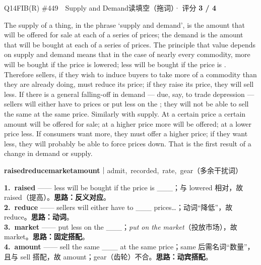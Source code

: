 \begin{qblock}{Q14\quad FIB(R) \#449\ \ Supply and Demand}{读填空（拖词）· 评分 \textcolor{cAccent}{\bfseries 3 / 4}}
\begin{promptbox}
The supply of a thing, in the phrase `supply and demand', is the amount that will be offered for sale at each of a series of prices; the demand is the amount that will be bought at each of a series of prices. The principle that value depends on supply and demand means that in the case of nearly every commodity, more will be bought if the price is lowered; less will be bought if the price is . Therefore sellers, if they wish to induce buyers to take more of a commodity than they are already doing, must reduce its price; if they raise its price, they will sell less. If there is a general falling-off in demand --- due, say, to trade depression --- sellers will either have to  prices or put less on the ; they will not be able to sell the same  at the same price. Similarly with supply. At a certain price a certain amount will be offered for sale; at a higher price more will be offered; at a lower price less. If consumers want more, they must offer a higher price; if they want less, they will probably be able to force prices down. That is the first result of a change in demand or supply.
\end{promptbox}
{\small \textbf{raised}\quad \textbf{reduce}\quad \textbf{market}\quad \textbf{amount}\quad ｜\quad admit,\ recorded,\ rate,\ gear（多余干扰词）}
\begin{notebox}\footnotesize
\textbf{1.\ raised} —— less will be bought if the price is \_\_\_；与 lowered 相对，故 raised（提高）。\textbf{思路：反义对应}。\\[2pt]
\textbf{2.\ reduce} —— sellers will either have to \_\_\_ prices…；动词“降低”，故 reduce。\textbf{思路：动词}。\\[2pt]
\textbf{3.\ market} —— put less on the \_\_\_；\emph{put on the market}（投放市场），故 market。\textbf{思路：固定搭配}。\\[2pt]
\textbf{4.\ amount} —— sell the same \_\_\_ at the same price；same 后需名词“数量”，且与 sell 搭配，故 amount；gear（齿轮）不合。\textbf{思路：动宾搭配}。
\end{notebox}
\end{qblock}







